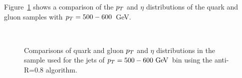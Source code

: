 Figure~\ref{fig:qg_pt500_basics_AKt_R08} shows a comparison of the $p_T$ and $\eta$ distributions of the
 quark and gluon samples with $p_T=500-600$~GeV. 
\begin{figure}
\begin{center}
\\
\caption{Comparisons of quark and gluon $p_T$ and $\eta$ 
distributions in the sample used for the jets of $\pt=500-600 \GeV$ bin using the anti-\kT R=0.8 algorithm.}
\label{fig:qg_pt500_basics_AKt_R08}
\end{center}
\end{figure}
